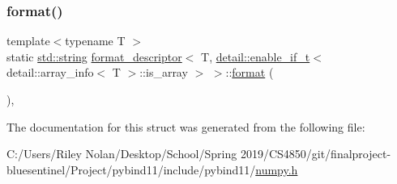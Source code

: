 \subsubsection{\texorpdfstring{format()}{format()}}
{\footnotesize\ttfamily template$<$typename T $>$ \\
static \mbox{\hyperlink{_s_d_l__opengl__glext_8h_ab4ccfaa8ab0e1afaae94dc96ef52dde1}{std\+::string}} \mbox{\hyperlink{structformat__descriptor}{format\+\_\+descriptor}}$<$ T, \mbox{\hyperlink{detail_2common_8h_a012819c9e8b5e04872a271f50f8b8196}{detail\+::enable\+\_\+if\+\_\+t}}$<$ detail\+::array\+\_\+info$<$ T $>$\+::is\+\_\+array $>$ $>$\+::\mbox{\hyperlink{_s_d_l__audio_8h_a71a65ffd977afe9c3fef116a5bc9ee27}{format}} (\begin{DoxyParamCaption}{ }\end{DoxyParamCaption})\hspace{0.3cm}{\ttfamily [inline]}, {\ttfamily [static]}}



The documentation for this struct was generated from the following file\+:\begin{DoxyCompactItemize}
\item 
C\+:/\+Users/\+Riley Nolan/\+Desktop/\+School/\+Spring 2019/\+C\+S4850/git/finalproject-\/bluesentinel/\+Project/pybind11/include/pybind11/\mbox{\hyperlink{numpy_8h}{numpy.\+h}}\end{DoxyCompactItemize}
